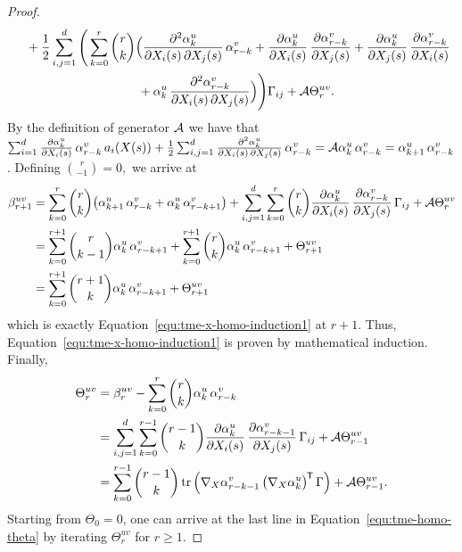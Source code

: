 \begin{proof}
\begin{align*}
		&\quad+ \frac{1}{2}\sum_{i, j=1}^d\Bigg(\sum^r_{k=0}\binom{r}{k}\Big(\frac{\partial^2 \alpha_k^u}{\partial X_i(s) \, \partial X_j(s)} \, \alpha^v_{r-k} + \frac{\partial \alpha_k^u}{\partial X_i(s)} \, \frac{\partial \alpha^v_{r-k}}{\partial X_j(s)} + \frac{\partial \alpha_k^u}{\partial X_j(s)} \, \frac{\partial \alpha^v_{r-k}}{\partial X_i(s)} \\
		&\qquad\qquad\qquad\qquad\qquad  + \alpha^u_k \, \frac{\partial^2 \alpha^v_{r-k}}{\partial X_i(s) \, \partial X_j(s)} \Big)\Bigg)\Gamma_{ij} + \mathcal{A} \Theta^{uv}_r.
	\end{align*}
	By the definition of generator $\mathcal{A}$ we have that $\sum^d_{i=1} \frac{\partial \alpha^u_k}{\partial X_i(s)} \, \alpha^v_{r-k} \, a_i(X(s)) + \frac{1}{2} \sum^d_{i,j=1} \frac{\partial^2 \alpha_k^u}{\partial X_i(s) \, \partial X_j(s)} \, \alpha^v_{r-k} = \mathcal{A} \alpha^u_k \, \alpha^v_{r-k} = \allowbreak \alpha^u_{k+1} \, \alpha^v_{r-k}$. Defining $\binom{r}{-1} = 0,$ we arrive at
	\begin{align*}
		\beta^{uv}_{r+1} &= \sum^r_{k=0} \binom{r}{k} \big(\alpha^u_{k+1} \, \alpha^v_{r-k} + \alpha^u_{k} \, \alpha^v_{r-k+1}\big) + \sum_{i, j=1}^d \sum^r_{k=0} \binom{r}{k}\frac{\partial \alpha_k^u}{\partial X_i(s)} \, \frac{\partial \alpha^v_{r-k}}{\partial X_j(s)} \,\Gamma_{ij} + \mathcal{A} \Theta^{uv}_r\\
		&= \sum^{r+1}_{k=0} \binom{r}{k-1}\alpha^u_k \, \alpha^v_{r-k+1} + \sum^{r+1}_{k=0}\binom{r}{k}\alpha^u_{k} \, \alpha^v_{r-k+1} + \Theta^{uv}_{r+1} \\
		&= \sum^{r+1}_{k=0} \binom{r+1}{k} \alpha^u_{k} \, \alpha^v_{r-k+1} + \Theta^{uv}_{r+1}
	\end{align*}
	which is exactly Equation~\eqref{equ:tme-x-homo-induction1} at $r+1$. Thus, Equation~\eqref{equ:tme-x-homo-induction1} is proven by mathematical induction. Finally, 
	\begin{equation}
		\begin{split}
			\Theta^{uv}_{r} &= \beta^{uv}_r - \sum^r_{k=0}\binom{r}{k} \alpha^u_k \, \alpha^v_{r-k} \\
			&= \sum^d_{i,j=1} \sum^{r-1}_{k=0} \binom{r-1}{k} \tash{\alpha^u_k}{X_i(s)} \, \tash{\alpha^v_{r-k-1}}{X_j(s)} \, \Gamma_{ij} + \A \Theta_{r-1}^{uv} \\
			&= \sum^{r-1}_{k=0} \binom{r-1}{k} \trace*{\nabla_X \alpha^v_{r-k-1} \, \big(\nabla_X \alpha^u_k\big)^\trans \, \Gamma} + \A \Theta_{r-1}^{uv}.
			\nonumber
		\end{split}
	\end{equation}
	Starting from $\Theta_0 = 0$, one can arrive at the last line in Equation~\eqref{equ:tme-homo-theta} by iterating $\Theta^{uv}_r$ for $r\geq 1$.
\end{proof}

